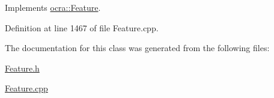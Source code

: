 Implements \hyperlink{classocra_1_1Feature_ad16d6b176b229280649ab405531e9a30}{ocra\+::\+Feature}.



Definition at line 1467 of file Feature.\+cpp.



The documentation for this class was generated from the following files\+:\begin{DoxyCompactItemize}
\item 
\hyperlink{Feature_8h}{Feature.\+h}\item 
\hyperlink{Feature_8cpp}{Feature.\+cpp}\end{DoxyCompactItemize}
